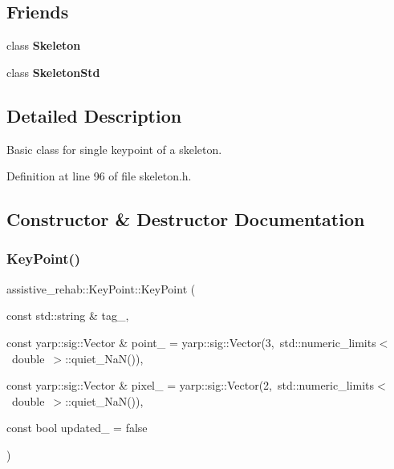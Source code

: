\subsection*{Friends}
\begin{DoxyCompactItemize}
\item 
\mbox{\label{classassistive__rehab_1_1KeyPoint_a6a11291b70c2cbded85d321ce539c62f}} 
class {\bfseries Skeleton}
\item 
\mbox{\label{classassistive__rehab_1_1KeyPoint_ad3de273c9c6dd0dc83202526523f8dd7}} 
class {\bfseries Skeleton\+Std}
\end{DoxyCompactItemize}


\subsection{Detailed Description}
Basic class for single keypoint of a skeleton. 

Definition at line 96 of file skeleton.\+h.



\subsection{Constructor \& Destructor Documentation}
\mbox{\label{classassistive__rehab_1_1KeyPoint_ad146e6b6fe96ae4eeaa9d4fa8eaebb40}} 
\subsubsection{\texorpdfstring{KeyPoint()}{KeyPoint()}}
{\footnotesize\ttfamily assistive\+\_\+rehab\+::\+Key\+Point\+::\+Key\+Point (\begin{DoxyParamCaption}\item[{const std\+::string \&}]{tag\+\_\+,  }\item[{const yarp\+::sig\+::\+Vector \&}]{point\+\_\+ = {\ttfamily yarp\+:\+:sig\+:\+:Vector(3,~std\+:\+:numeric\+\_\+limits$<$~double~$>$\+:\+:quiet\+\_\+NaN())},  }\item[{const yarp\+::sig\+::\+Vector \&}]{pixel\+\_\+ = {\ttfamily yarp\+:\+:sig\+:\+:Vector(2,~std\+:\+:numeric\+\_\+limits$<$~double~$>$\+:\+:quiet\+\_\+NaN())},  }\item[{const bool}]{updated\+\_\+ = {\ttfamily false} }\end{DoxyParamCaption})}



